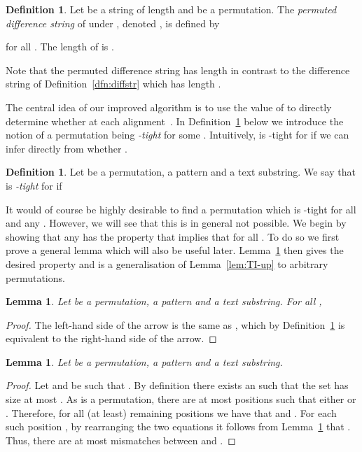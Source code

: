 \documentclass[11pt]{article}
\theoremstyle{plain}
\newtheorem{lemma}[theorem]{Lemma}
\theoremstyle{definition}
\newtheorem{definition}[theorem]{Definition}
\begin{document}
\begin{definition}
    \label{dfn:pdiffstr}
    Let  be a string of length  and  be a permutation. The \emph{permuted difference string} of  under , denoted , is defined by

for all . The length of  is .
\end{definition}

Note that the permuted difference string   has length  in contrast to the difference string  of Definition~\ref{dfn:diffstr} which has length .

The central idea of our improved algorithm is to use the value of  to directly determine whether  at each alignment~. In Definition~\ref{dfn:TI-ktight} below we introduce the notion of a permutation being \emph{-tight} for some . Intuitively,  is -tight for  if we can infer directly from  whether .

\begin{definition}
    \label{dfn:TI-ktight}
    Let  be a permutation,  a pattern and  a text substring. We say that  is \emph{-tight} for  if

\end{definition}

It would of course be highly desirable to find a permutation  which is -tight for all  and any . However, we will see that this is in general not possible. 
We begin by showing that any  has the property that   implies that  for all . To do so we first prove a general lemma which will also be useful later. Lemma~\ref{lem:TI-permup} then gives the desired property and is a generalisation of Lemma~\ref{lem:TI-up} to arbitrary permutations.

\begin{lemma}
    \label{lem:TI-kmisiff}
    Let  be a permutation,  a pattern and  a text substring. For all ,

\end{lemma}
\begin{proof}
    The left-hand side of the arrow is the same as , which by Definition~\ref{dfn:pdiffstr} is equivalent to the right-hand side of the arrow.
\end{proof}


\begin{lemma}
    \label{lem:TI-permup}
    Let  be a permutation,  a pattern and  a text substring.

\end{lemma}
\begin{proof}
    Let  and  be such that . By definition there exists an  such that the set  has size at most . As  is a permutation, there are at most  positions  such that either  or . Therefore, for all (at least)  remaining positions  we have that  and . For each such position , by rearranging the two equations it follows from Lemma~\ref{lem:TI-kmisiff} that . Thus, there are at most  mismatches between  and .
\end{proof}
\end{document}
